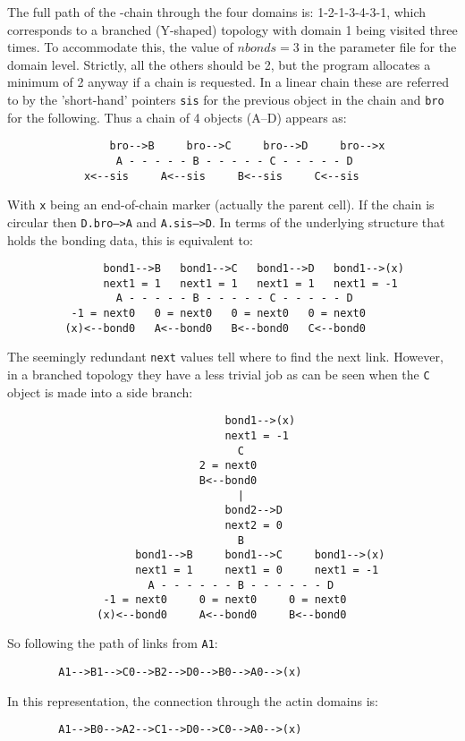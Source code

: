 The full path of the \CA-chain through the four domains is: 1-2-1-3-4-3-1, which corresponds to a
branched (Y-shaped) topology with domain 1 being visited three times.  To accommodate this, the
value of $nbonds = 3$ in the parameter file for the domain level.   Strictly, all the others should
be 2, but the program allocates a minimum of 2 anyway if a chain is requested.   In a linear chain 
these are referred to by the 'short-hand' pointers {\tt sis} for the previous object in the chain
and {\tt bro} for the following.   Thus a chain of 4 objects (A--D) appears as:
\begin{singlespace}
\begin{verbatim}
                bro-->B     bro-->C     bro-->D     bro-->x
                 A - - - - - B - - - - - C - - - - - D
            x<--sis     A<--sis     B<--sis     C<--sis
\end{verbatim}
\end{singlespace}
With {\tt x} being an end-of-chain marker (actually the parent cell).  If the chain is
circular then {\tt D.bro-->A} and {\tt A.sis-->D}.
In terms of the underlying structure that holds the bonding data, this is equivalent to:
\begin{singlespace}
\begin{verbatim}
               bond1-->B   bond1-->C   bond1-->D   bond1-->(x)
               next1 = 1   next1 = 1   next1 = 1   next1 = -1
                 A - - - - - B - - - - - C - - - - - D
          -1 = next0   0 = next0   0 = next0   0 = next0
         (x)<--bond0   A<--bond0   B<--bond0   C<--bond0
\end{verbatim}
\end{singlespace}
The seemingly redundant {\tt next} values tell where to find the next link.
However, in a branched topology they have a less trivial job as can be seen when the {\tt C}
object is made into a side branch:
\begin{singlespace}
\begin{verbatim}
                                  bond1-->(x)
                                  next1 = -1
                                    C      
                              2 = next0 
                              B<--bond0    
                                    |           
                                  bond2-->D      
                                  next2 = 0      
                                    B            
                    bond1-->B     bond1-->C     bond1-->(x)
                    next1 = 1     next1 = 0     next1 = -1
                      A - - - - - - B - - - - - - D    
               -1 = next0     0 = next0     0 = next0
              (x)<--bond0     A<--bond0     B<--bond0
\end{verbatim}
\end{singlespace}
So following the path of links from {\tt A1}:
\begin{verbatim}
        A1-->B1-->C0-->B2-->D0-->B0-->A0-->(x)
\end{verbatim}
In this representation, the connection through the actin domains is:
\begin{verbatim}
        A1-->B0-->A2-->C1-->D0-->C0-->A0-->(x)
\end{verbatim}



